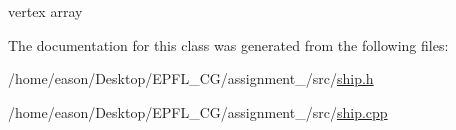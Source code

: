 vertex array 



The documentation for this class was generated from the following files\+:\begin{DoxyCompactItemize}
\item 
/home/eason/\+Desktop/\+E\+P\+F\+L\+\_\+\+C\+G/assignment\+\_/src/\hyperlink{ship_8h}{ship.\+h}\item 
/home/eason/\+Desktop/\+E\+P\+F\+L\+\_\+\+C\+G/assignment\+\_/src/\hyperlink{ship_8cpp}{ship.\+cpp}\end{DoxyCompactItemize}
